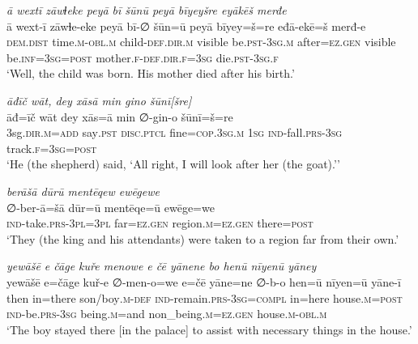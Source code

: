 \ea \label{KŠ.23}
\textit{ā wextī zāwɫeke peyā bī šūnū peyā bīyeyšre eyākēš merđe} \\ 
\gll ā wext-ī zāwɫe-eke peyā bī-∅ šūn=ū peyā bīyey=š=re eđā-ekē=š merđ-e \\ 
 \textsc{dem.dist} time\textsc{.m}\textsc{-obl}\textsc{.m} child\textsc{-def}\textsc{.dir}\textsc{.m} visible be\textsc{.pst}\textsc{-3sg}\textsc{.m} after\textsc{=ez.gen} visible be\textsc{.inf}\textsc{=3sg}\textsc{=\textsc{post}} mother\textsc{.f}\textsc{-def}\textsc{.dir}\textsc{.f}\textsc{=3sg} die\textsc{.pst}\textsc{-3sg}\textsc{.f} \\ 
\glt `Well, the child was born. His mother died after his birth.'
\z 
 
\ea \label{KŠ.29}
\textit{āđīč wāt, dey xāsā min gino šūnī[šre]} \\ 
\gll āđ=īč wāt dey xās=ā min ∅-gin-o šūnī=š=re \\ 
 3sg\textsc{.dir}\textsc{.m}\textsc{=add} say\textsc{.pst} \textsc{disc.ptcl} fine\textsc{=cop}\textsc{.3sg}\textsc{.m} \textsc{1sg} \textsc{ind-}fall\textsc{.prs}\textsc{-3sg} track\textsc{.f}\textsc{=3sg}\textsc{=\textsc{post}} \\ 
\glt `He (the shepherd) said, ‘All right, I will look after her (the goat).’'
\z 
 
\ea \label{KŠ.48}
\textit{berāšā dūrū mentēqew ewēgewe} \\ 
\gll ∅-ber-ā=šā dūr=ū mentēqe=ū ewēge=we \\ 
 \textsc{ind-}take\textsc{.prs}\textsc{-3pl}\textsc{=3pl} far\textsc{=ez.gen} region\textsc{.m}\textsc{=ez.gen} there\textsc{=\textsc{post}} \\ 
\glt `They (the king and his attendants) were taken to a region far from their own.'
\z 
 
\ea \label{KŠ.49}
\textit{yewāšē e čāge kuře menowe e čē yānene bo henū nīyenū yāney} \\ 
\gll yewāšē e=čāge kuř-e ∅-men-o=we e=čē yāne=ne ∅-b-o hen=ū nīyen=ū yāne-ī \\ 
 then in=there son/boy\textsc{.m}\textsc{-def} \textsc{ind-}remain\textsc{.prs}\textsc{-3sg}\textsc{=compl} in=here house\textsc{.m}\textsc{=\textsc{post}} \textsc{ind-}be\textsc{.prs}\textsc{-3sg} being\textsc{.m}=and non\_being\textsc{.m}\textsc{=ez.gen} house\textsc{.m}\textsc{-obl}\textsc{.m} \\ 
\glt `The boy stayed there [in the palace] to assist with necessary things in the house.'
\z 
 
